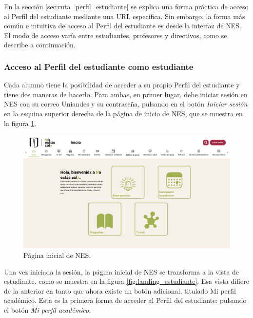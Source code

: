 En la sección \ref{sec:ruta_perfil_estudiante} se explica una forma práctica de acceso al Perfil del estudiante mediante una URL específica. Sin embargo, la forma más común e intuitiva de acceso al Perfil del estudiante es desde la interfaz de \gls{NES}. El modo de acceso varía entre estudiantes, profesores y directivos, como se describe a continuación.

\subsubsection{Acceso al Perfil del estudiante como estudiante}

Cada alumno tiene la posibilidad de acceder a su propio Perfil del estudiante y tiene dos maneras de hacerlo. Para ambas, en primer lugar, debe iniciar sesión en \gls{NES} con su correo Uniandes y su contraseña, pulsando en el botón \textit{Iniciar sesión} en la esquina superior derecha de la página de inicio de \gls{NES}, que se muestra en la figura \ref{fig:landing}.

\begin{figure}[H]
	\includegraphics[width=\textwidth]{assets/nes/landing.png}
	\caption{Página inicial de NES.}
	\label{fig:landing}
\end{figure}

Una vez iniciada la sesión, la página inicial de NES se transforma a la vista de estudiante, como se muestra en la figura \ref{fig:landing_estudiante}. Esa vista difiere de la anterior en tanto que ahora existe un botón adicional, titulado Mi perfil académico. Esta es la primera forma de acceder al Perfil del estudiante: pulsando el botón \textit{Mi perfil académico}.

